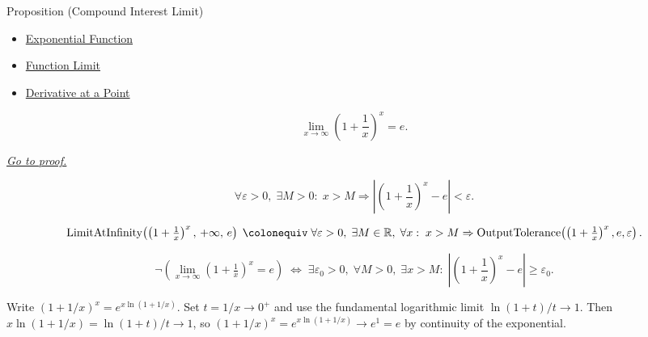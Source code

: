 
\begin{propositionbox}{Proposition (Compound Interest Limit)}

\begin{dependencies}
\begin{itemize}
  \item \hyperref[def:exponential]{Exponential Function}
  \item \hyperref[def:limit-function]{Function Limit}
  \item \hyperref[def:derivative-at-a-point]{Derivative at a Point}
\end{itemize}
\end{dependencies}
\begin{proposition}
\label{prop:limit-compound-interest}
\[
  \lim_{x \to \infty} \left(1 + \frac{1}{x}\right)^x = e.
\]

\smallskip\noindent
\hyperref[prf:limit-compound-interest]{\textit{Go to proof.}}
\end{proposition}
\end{propositionbox}\begin{remark*}
\[
  \forall\varepsilon>0,\;\exists M>0:\;
  x>M \Rightarrow
  \left|\!\left(1+\frac{1}{x}\right)^x - e\right| < \varepsilon.
\]
\end{remark*}

\begin{remark*}
\[
  \operatorname{LimitAtInfinity}\!\left(\left(1+\tfrac{1}{x}\right)^x,\,+\infty,\,e\right)
  \;\colonequiv\;
  \forall\varepsilon>0,\;\exists M\in\mathbb{R},\;\forall x:\;
  x>M \Rightarrow \operatorname{OutputTolerance}\!\left(\left(1+\tfrac{1}{x}\right)^x,e,\varepsilon\right).
\]
\end{remark*}

\begin{remark*}
\[
  \neg\left(\lim_{x\to\infty}\!\left(1+\tfrac{1}{x}\right)^x=e\right)
  \;\iff\;
  \exists\varepsilon_0>0,\;\forall M>0,\;\exists x>M:\;
  \left|\!\left(1+\frac{1}{x}\right)^x - e\right|\geq\varepsilon_0.
\]
\end{remark*}

\begin{remark*}
Write $(1+1/x)^x = e^{x\ln(1+1/x)}$. Set $t = 1/x \to 0^+$ and use
the fundamental logarithmic limit $\ln(1+t)/t \to 1$. Then
$x\ln(1+1/x) = \ln(1+t)/t \to 1$, so $(1+1/x)^x = e^{x\ln(1+1/x)}
\to e^1 = e$ by continuity of the exponential.
\end{remark*}


